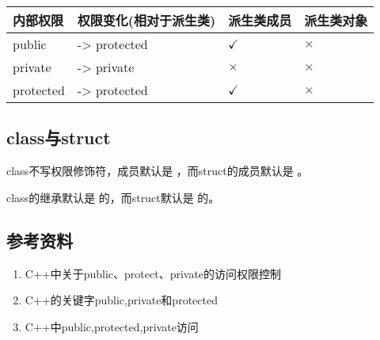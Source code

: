 \documentclass[letterpaper,10pt,english]{sphinxmanual}
\begin{document}
\begin{savenotes}\sphinxattablestart
\centering
{}
\label{\detokenize{cpp/15_classAccess:id6}}
\sphinxaftercaption
\begin{tabulary}{\linewidth}[t]{|T|T|T|T|}
\hline
\sphinxstyletheadfamily 
内部权限
&\sphinxstyletheadfamily 
权限变化(相对于派生类)
&\sphinxstyletheadfamily 
派生类成员
&\sphinxstyletheadfamily 
派生类对象
\\
\hline
public
&
-\textgreater{} protected
&
\(\checkmark\)
&
\(\times\)
\\
\hline
private
&
-\textgreater{} private
&
\(\times\)
&
\(\times\)
\\
\hline
protected
&
-\textgreater{} protected
&
\(\checkmark\)
&
\(\times\)
\\
\hline
\end{tabulary}
\par
\sphinxattableend\end{savenotes}


\subsection{class与struct}
\label{\detokenize{cpp/15_classAccess:classstruct}}
class不写权限修饰符，成员默认是  ，而struct的成员默认是  。

class的继承默认是  的，而struct默认是  的。


\subsection{参考资料}
\label{\detokenize{cpp/15_classAccess:id2}}\begin{enumerate}
\item {} 
C++中关于public、protect、private的访问权限控制

\end{enumerate}
\begin{quote}

\end{quote}
\begin{enumerate}
\setcounter{enumi}{1}
\item {} 
C++的关键字public,private和protected

\end{enumerate}
\begin{quote}

\end{quote}
\begin{enumerate}
\setcounter{enumi}{2}
\item {} 
C++中public,protected,private访问

\end{enumerate}
\begin{quote}

\end{quote}
\end{document}
